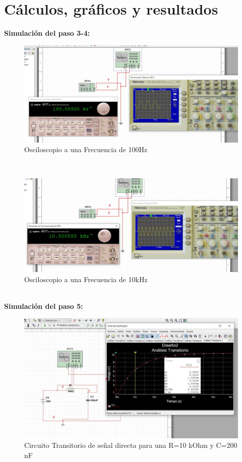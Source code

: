 \documentclass[twoside,twocolumn]{article}
\begin{document}
\section{Cálculos, gráficos y resultados}     
 \textbf{Simulación del paso 3-4:}
  \begin{figure}[h]
    \centering
    \includegraphics[scale=0.2]{Imagenes/2.1.JPG}
    \caption{Osciloscopio a una Frecuencia de 100Hz}
    \label{fig:circuito1}
  \end{figure}\\
  
  \begin{figure}[h]
    \centering
    \includegraphics[scale=0.2]{Imagenes/2.2.JPG}
    \caption{Osciloscopio a una Frecuencia de 10kHz}
    \label{fig:circuito1}
  \end{figure}\\
\newpage  
 \textbf{Simulación del paso 5:}
  \begin{figure}[h]
    \centering
    \includegraphics[scale=0.2]{Imagenes/3.1.JPG}
    \caption{Circuito Transitorio de señal directa para una R=10 kOhm y C=200 nF}
    \label{fig:circuito1}
  \end{figure}\\  
\end{document}
